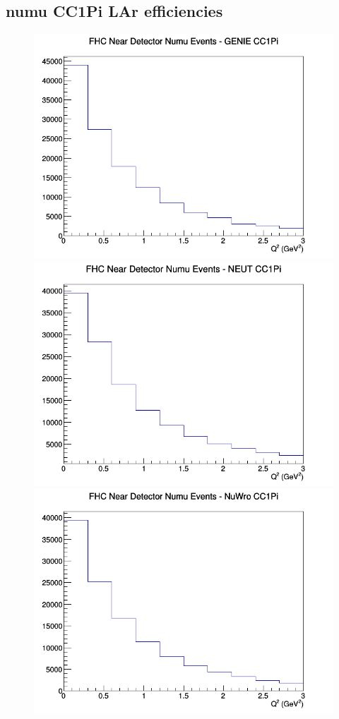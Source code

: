 \documentclass[12pt]{article}
\begin{document}
\subsection{numu CC1Pi LAr efficiencies}
\begin{figure}[h]
\includegraphics[width=\linewidth]{eff_Q2/LAr/CC1Pi_FHC_ND_numu_Q2_GENIE.png}
\endminipage
{}
\includegraphics[width=\linewidth]{eff_Q2/LAr/CC1Pi_FHC_ND_numu_Q2_NEUT.png}
\endminipage
{}
\includegraphics[width=\linewidth]{eff_Q2/LAr/CC1Pi_FHC_ND_numu_Q2_NuWro.png}

\end{figure}
\end{document}
